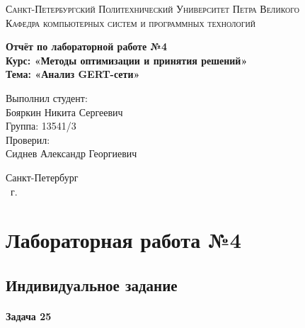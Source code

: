 \documentclass[14pt,a4paper,report]{report}
\begin{document}
\def\contentsname{Содержание}

\begin{titlepage}
	\begin{center}
		\textsc{Санкт-Петербургский Политехнический 
			Университет Петра Великого\\[5mm]
			Кафедра компьютерных систем и программных технологий}
		
		\vfill
		
		\textbf{Отчёт по лабораторной работе №4\\[3mm]
			Курс: «Методы оптимизации и принятия решений»\\[3mm]
			Тема: «Анализ GERT-сети»\\[35mm]
			}
	\end{center}
	
	\hfill
	\begin{minipage}{.5\textwidth}
		Выполнил студент:\\[2mm] 
		Бояркин Никита Сергеевич\\
		Группа: 13541/3\\[5mm]
		
		Проверил:\\[2mm] 
		Сиднев Александр Георгиевич
	\end{minipage}
	\vfill
	\begin{center}
		Санкт-Петербург\\ \the\year\ г.
	\end{center}
\end{titlepage}

\tableofcontents
\clearpage

\chapter{Лабораторная работа №4}

\section{Индивидуальное задание}

\subsubsection{Задача 25}
\end{document}
